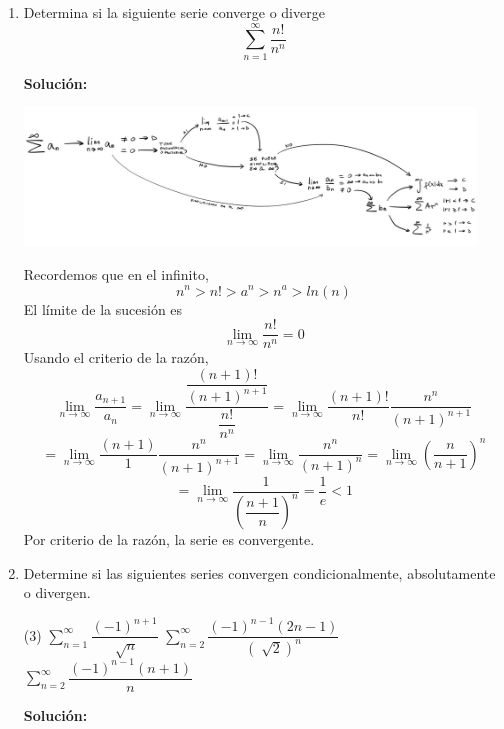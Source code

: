 \documentclass[12pt]{article}
\newenvironment{solucion}
{\begin{mdframed}[backgroundcolor=black!10]
		{\bf Solución:}\\
	}
	{
	\end{mdframed}
}
\newenvironment{preguntas}
{\begin{enumerate}\itemsep12pt
	}
	{
	\end{enumerate}
}
\newcommand{\ra}{\rightarrow}
\begin{document}
\begin{preguntas}
\item Determina si la siguiente serie converge o diverge
$$\sum\limits_{n=1}^{\infty}\dfrac{n!}{n^n}$$
\begin{solucion}
\begin{center}
\includegraphics[width=12cm]{../../../../img/mapa_series}
\end{center}
Recordemos que en el infinito,
			$$n^n > n! > a^n > n^a > ln(n)$$
			El límite de la sucesión es
			$$\lim\limits_{n\ra\infty}\dfrac{n!}{n^n} = 0$$
			Usando el criterio de la razón,
			$$\lim\limits_{n \ra \infty} \dfrac{a_{n+1}}{a_n}
			= \lim\limits_{n \ra \infty} \dfrac{\dfrac{(n+1)!}{(n+1)^{n+1}}}{\dfrac{n!}{n^n}}
			= \lim\limits_{n \ra \infty} \dfrac{(n+1)!}{n!}\dfrac{n^n}{(n+1)^{n+1}}$$
			$$= \lim\limits_{n \ra \infty} \dfrac{(n+1)}{1}\dfrac{n^n}{(n+1)^{n+1}}
			= \lim\limits_{n \ra \infty} \dfrac{n^n}{(n+1)^{n}}
			= \lim\limits_{n \ra \infty} \left(\dfrac{n}{n+1}\right)^n$$
			$$= \lim\limits_{n \ra \infty} \dfrac{1}{\left(\dfrac{n+1}{n}\right)^n}
			= \dfrac{1}{e} < 1$$
			Por criterio de la razón, la serie es convergente.
\end{solucion}
\item Determine si las siguientes series convergen condicionalmente, absolutamente o divergen.
\begin{tasks}(3)
\task $\sum\limits_{n=1}^{\infty}\dfrac{(-1)^{n+1}}{\sqrt[]{n}}$
\task $\sum\limits_{n=2}^{\infty}\dfrac{(-1)^{n-1}(2n-1)}{(\sqrt[]{2})^n}$
\task $\sum\limits_{n=2}^{\infty}\dfrac{(-1)^{n-1}(n+1)}{n}$
\end{tasks}
\begin{solucion}


\end{solucion}
\end{preguntas}
\end{document}
